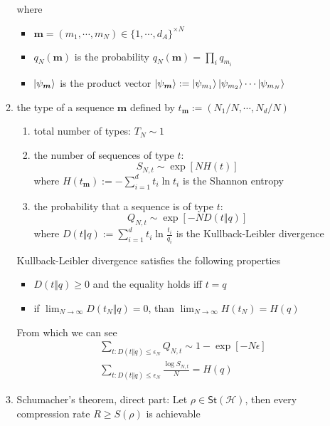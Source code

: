 \documentclass[11pt,a4paper]{article}%
\numberwithin{equation}{section}
\renewcommand*{\vec}[1]{\bm{#1}}%
\newcommand{\St}{{\mathsf{St}}}
\begin{document}
\begin{enumerate}
\begin{enumerate}
        where
        \begin{itemize}
            \item $\vec m = (m_1,\cdots, m_N)\in\{1,\cdots,d_A\}^{\times N}$
            \item $q_N(\vec m)$ is the probability $q_N(\vec m) = \prod_i q_{m_i}$ 
            \item $\ket{\psi_{\vec m}}$ is the product vector $\ket{\psi_{\vec m}} := \ket{\psi_{m_1}}\ket{\psi_{m_2}}\cdots\ket{\psi_{m_N}}$
        \end{itemize}
        \item the type of a sequence $\vec m$ defined by $t_{\vec m}:=(N_1/N,\cdots,N_{d}/N)$
        \begin{enumerate}
            \item total number of types: $T_N \sim 1$
            \item the number of sequences of type $t$: 
            \begin{equation}
                S_{N,t} \sim \exp[N H(t)]
            \end{equation}
            where $H(t_{\vec m}) := -\sum_{i=1}^d t_i\ln t_i$ is the Shannon entropy
            \item the probability that a sequence is of type $t$:
            \begin{equation}
                 Q_{N,t}\sim \exp[-ND(t\Vert q)]
            \end{equation}
            where $D(t\Vert q) := \sum_{i=1}^d t_i\ln\frac{t_i}{q_i}$ is the Kullback-Leibler divergence
        \end{enumerate}
        Kullback-Leibler divergence satisfies the following properties
        \begin{itemize}
            \item $D(t\Vert q)\ge 0$ and the equality holds iff $t = q $
            \item if $\lim_{N\to\infty}D(t_N\Vert q) =0$, than $\lim_{N\to\infty}H(t_N) =H(q)$
        \end{itemize}
        From which we can see
        \begin{align}
            &\sum_{t:D(t\Vert q)\le\epsilon_N} Q_{N,t} \sim 1-\exp[-N\epsilon] \\
            &\sum_{t:D(t\Vert q)\le\epsilon_N} \frac{\log S_{N,t}}N = H(q)%
        \end{align}
        \item Schumacher's theorem, direct part: Let $\rho \in \St(\mathcal H)$, then every compression rate $R\ge S(\rho)$ is achievable

\end{enumerate}
\end{enumerate}
\end{document}
